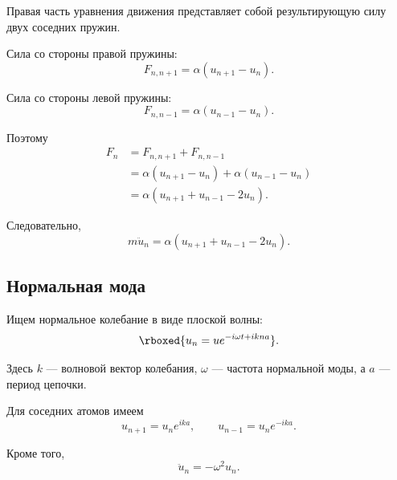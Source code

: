 \documentclass[../final.tex]{subfiles}
\begin{document}
Правая часть уравнения движения представляет собой
результирующую силу двух соседних пружин.

Сила со стороны правой пружины:
%
\begin{equation*}
    F_{n,n+1}
    =
    \alpha(u_{n+1}-u_n).
\end{equation*}

Сила со стороны левой пружины:
%
\begin{equation*}
    F_{n,n-1}
    =
    \alpha(u_{n-1}-u_n).
\end{equation*}

Поэтому
%
\begin{align*}
    F_n
    &=
    F_{n,n+1}
    +
    F_{n,n-1}
    \\
    &=
    \alpha(u_{n+1}-u_n)
    +
    \alpha(u_{n-1}-u_n)
    \\
    &=
    \alpha
    \left(
        u_{n+1}
        +
        u_{n-1}
        -
        2u_n
    \right).
\end{align*}

Следовательно,
%
\begin{equation*}
    m\ddot u_n
    =
    \alpha
    \left(
        u_{n+1}
        +
        u_{n-1}
        -
        2u_n
    \right).
\end{equation*}



\subsection*{Нормальная мода}

Ищем нормальное колебание в виде плоской волны:
%
\begin{equation*}
    \rboxed{
        u_n
        =
        u
        e^{-i\omega t+ikna}
    }.
\end{equation*}

Здесь $k$ --- волновой вектор колебания,
$\omega$ --- частота нормальной моды,
а $a$ --- период цепочки.

Для соседних атомов имеем
%
\begin{equation*}
    u_{n+1}
    =
    u_n e^{ika},
    \qquad
    u_{n-1}
    =
    u_n e^{-ika}.
\end{equation*}

Кроме того,
%
\begin{equation*}
    \ddot u_n
    =
    -\omega^2u_n.
\end{equation*}
\end{document}
